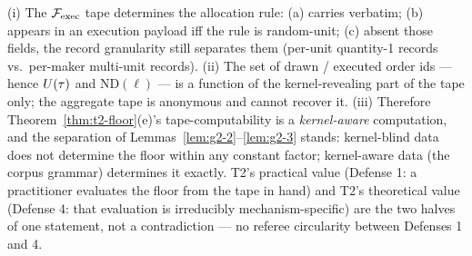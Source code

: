 
\begin{lemma}
\label{lem:g2-4}
(i) The $\mathcal{F}_{\mathrm{exec}}$ tape determines the allocation rule: (a)
 carries  verbatim; (b)
 appears in an execution payload iff the rule is
random-unit; (c) absent those fields, the record granularity still separates
them (per-unit quantity-1 records vs.\ per-maker multi-unit records).
(ii) The set of drawn / executed order ids --- hence $U(\tau)$ and
$\mathrm{ND}(\ell)$ --- is a function of the kernel-revealing part of the
tape only; the aggregate tape is anonymous and cannot recover it.
(iii) Therefore Theorem~\ref{thm:t2-floor}(e)'s tape-computability is a
\emph{kernel-aware} computation, and the separation of
Lemmas~\ref{lem:g2-2}--\ref{lem:g2-3} stands: kernel-blind data does not
determine the floor within any constant factor; kernel-aware data (the
corpus grammar) determines it exactly. T2's practical value (Defense 1: a
practitioner evaluates the floor from the tape in hand) and T2's theoretical
value (Defense 4: that evaluation is irreducibly mechanism-specific) are the
two halves of one statement, not a contradiction --- no referee circularity
between Defenses 1 and 4.
\end{lemma}


